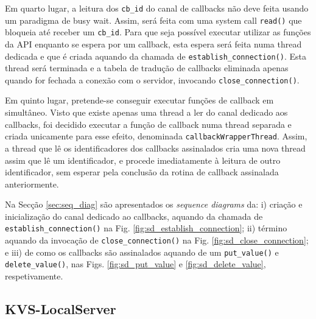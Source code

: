 Em quarto lugar, a leitura dos \texttt{cb\_id} do canal de callbacks não deve feita usando um paradigma de busy wait. Assim, será feita com uma system call \texttt{read()} que bloqueia até receber um \texttt{cb\_id}. Para que seja possível executar utilizar as funções da API enquanto se espera por um callback, esta espera será feita numa thread dedicada e que é criada aquando da chamada de \texttt{establish\_connection()}. Esta thread será terminada e a tabela de tradução de callbacks eliminada apenas quando for fechada a conexão com o servidor, invocando \texttt{close\_connection()}.

Em quinto lugar, pretende-se conseguir executar funções de callback em simultâneo. Visto que existe apenas uma thread a ler do canal dedicado aos callbacks, foi decidido executar a função de callback numa thread separada e criada unicamente para esse efeito, denominada \texttt{callbackWrapperThread}. Assim, a thread que lê os identificadores dos callbacks assinalados cria uma nova thread assim que lê um identificador, e procede imediatamente à leitura de outro identificador, sem esperar pela conclusão da rotina de callback assinalada anteriormente.

Na Secção \ref{sec:seq_diag} são apresentados os \textit{sequence diagrams} da: i) criação e inicialização do canal dedicado ao callbacks, aquando da chamada de \texttt{establish\_connection()} na Fig. \ref{fig:sd_establish_connection}; ii) término aquando da invocação de \texttt{close\_connection()} na Fig. \ref{fig:sd_close_connection}; e iii) de como os callbacks são assinalados aquando de um \texttt{put\_value()} e \texttt{delete\_value()}, nas Figs. \ref{fig:sd_put_value} e \ref{fig:sd_delete_value}, respetivamente.

\subsection{KVS-LocalServer}

% 

